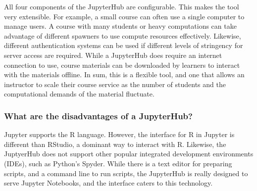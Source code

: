 All four components of the JupyterHub are configurable.
This makes the tool very extensible. 
For example, a small course can often use a single computer to manage users.
A course with many students or heavy computations can take advantage of different spawners to use compute resources effectively.
Likewise, different authentication systems can be used if different levels of stringency for server access are required.
While a JupyterHub does require an internet connection to use, course materials can be downloaded by learners to interact with the materials offline. 
In sum, this is a flexible tool, and one that allows an instructor to scale their course service as the number of students and the computational demands of the material fluctuate. 


{}

\subsubsection{What are the disadvantages of a JupyterHub?}

Jupyter supports the R language.
However, the interface for R in Jupyter is different than RStudio, a dominant way to interact with R.
Likewise, the JuptyerHub does not support other popular integrated development environments (IDEs), such as Python's Spyder.
While there is a text editor for preparing scripts, and a command line to run scripts, the JupyterHub is really designed to serve Jupyter Notebooks, and the interface caters to this technology.




